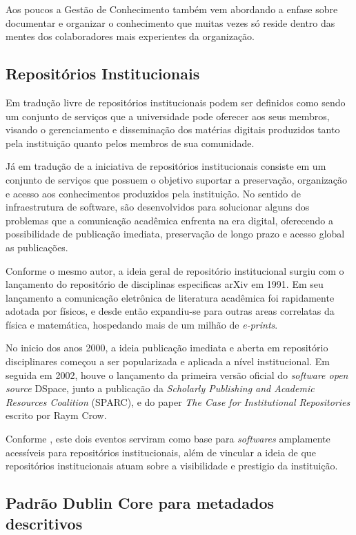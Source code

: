 Aos poucos a Gestão de Conhecimento também vem abordando a enfase sobre documentar
e organizar o conhecimento que muitas vezes só reside dentro das mentes
dos colaboradores mais experientes da organização.

\subsection{Repositórios Institucionais}

Em tradução livre de \cite{LYNCH:2003} repositórios institucionais podem
ser definidos como sendo um conjunto de serviços que a universidade pode
oferecer aos seus membros, visando o gerenciamento e disseminação dos matérias
digitais produzidos tanto pela instituição quanto pelos membros de sua comunidade.

Já em tradução de \cite{2015:Callicott} a iniciativa de repositórios institucionais
consiste em um conjunto de serviços que possuem o objetivo suportar a preservação,
organização e acesso aos conhecimentos produzidos pela instituição. No sentido de
infraestrutura de software, são desenvolvidos para solucionar alguns dos problemas
que a comunicação acadêmica enfrenta na era digital, oferecendo a possibilidade
de publicação imediata, preservação de longo prazo e acesso global as publicações.

Conforme o mesmo autor, a ideia geral de repositório institucional surgiu com o
lançamento do repositório de disciplinas especificas arXiv em 1991. Em seu
lançamento a comunicação eletrônica de literatura acadêmica foi rapidamente
adotada por físicos, e desde então expandiu-se para outras areas correlatas
da física e matemática, hospedando mais de um milhão de \emph{e-prints}.

No inicio dos anos 2000, a ideia publicação imediata e aberta em
repositório disciplinares começou a ser popularizada e aplicada a nível
institucional. Em seguida em 2002, houve o lançamento da primeira versão
oficial do \emph{software open source} DSpace, junto a publicação da
\emph{Scholarly Publishing and Academic Resources Coalition} (SPARC),
e do paper \emph{The Case for Institutional Repositories} escrito por
Raym Crow.

Conforme \cite{2015:Callicott}, este dois eventos serviram como base
para \emph{softwares} amplamente acessíveis para repositórios institucionais,
além de vincular a ideia de que repositórios institucionais atuam
sobre a visibilidade e prestigio da instituição.

\subsection{Padrão Dublin Core para metadados descritivos}

